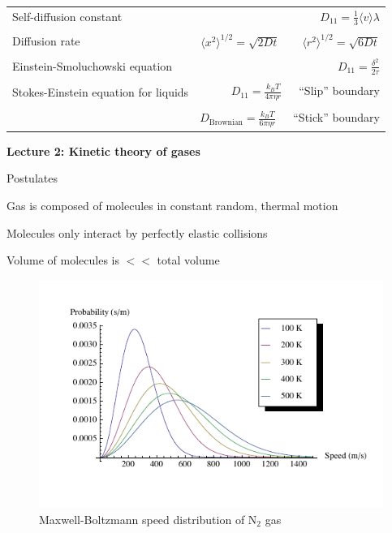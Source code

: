 \message{ !name(Outline.tex)}\documentclass[11pt]{article}
\begin{document}
\begin{outline}
\begin{table}
\begin{center}
\begin{tabular}{|lr|}
Self-diffusion constant &
$\displaystyle D_{11} = \frac{1}{3}\langle v \rangle \lambda $ \\ & \\

Diffusion rate &
$\displaystyle \langle x^2 \rangle^{1/2} = \sqrt{2 D t} $\ \ \ \  $\langle r^2 \rangle^{1/2} = \sqrt{6
D t}$ \\ & \\

Einstein-Smoluchowski equation & $\displaystyle D_{11}= \frac{\delta^2}{2\tau}$ \\ & \\

Stokes-Einstein equation for liquids & $\displaystyle D_{11}=\frac{k_BT}{4\pi\eta r}$\ \ \
``Slip'' boundary \\
 & \\
 & $\displaystyle D_\mathrm{Brownian}=\frac{k_BT}{6\pi\eta r}$\ \ \ ``Stick'' boundary \\
\hline
    \end{tabular}
\end{center}
 \end{table}

\item{{\bf Lecture 2: Kinetic theory of gases}}
  \begin{outline}
  \item{Postulates}
    \begin{outline}
    \item Gas is composed of molecules in constant random, thermal motion
    \item Molecules only interact by perfectly elastic collisions
    \item Volume of molecules is $<<$ total volume
    \end{outline}

\begin{figure}
\begin{center}
\includegraphics[scale=1.25]{Images/MaxwellBoltzmann.pdf}
\caption{Maxwell-Boltzmann speed distribution of N$_2$ gas}
\end{center}
\end{figure}


\end{outline}
\end{outline}
\end{document}
